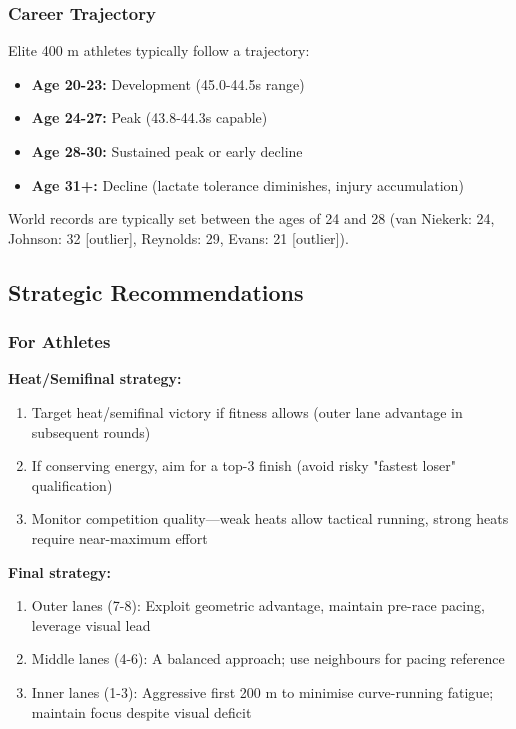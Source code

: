 \subsubsection{Career Trajectory}

Elite 400 m athletes typically follow a trajectory:
\begin{itemize}
    \item \textbf{Age 20-23:} Development (45.0-44.5s range)
    \item \textbf{Age 24-27:} Peak (43.8-44.3s capable)
    \item \textbf{Age 28-30:} Sustained peak or early decline
    \item \textbf{Age 31+:} Decline (lactate tolerance diminishes, injury accumulation)
\end{itemize}

World records are typically set between the ages of 24 and 28 (van Niekerk: 24, Johnson: 32 [outlier], Reynolds: 29, Evans: 21 [outlier]).

\subsection{Strategic Recommendations}

\subsubsection{For Athletes}

\textbf{Heat/Semifinal strategy:}
\begin{enumerate}
    \item Target heat/semifinal victory if fitness allows (outer lane advantage in subsequent rounds)
    \item If conserving energy, aim for a top-3 finish (avoid risky "fastest loser" qualification)
    \item Monitor competition quality—weak heats allow tactical running, strong heats require near-maximum effort
\end{enumerate}

\textbf{Final strategy:}
\begin{enumerate}
    \item Outer lanes (7-8): Exploit geometric advantage, maintain pre-race pacing, leverage visual lead
    \item Middle lanes (4-6): A balanced approach; use neighbours for pacing reference
    \item Inner lanes (1-3): Aggressive first 200 m to minimise curve-running fatigue; maintain focus despite visual deficit
\end{enumerate}

